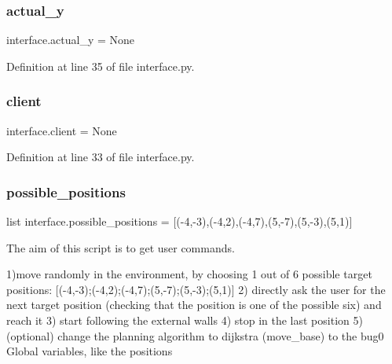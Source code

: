 \mbox{\label{namespaceinterface_af27b0b163a429bf0725f6c471e3f1998}} 
\subsubsection{\texorpdfstring{actual\+\_\+y}{actual\_y}}
{\footnotesize\ttfamily interface.\+actual\+\_\+y = None}



Definition at line 35 of file interface.\+py.

\mbox{\label{namespaceinterface_a2dc19bae4560767a9cff309d17ca0fc3}} 
\subsubsection{\texorpdfstring{client}{client}}
{\footnotesize\ttfamily interface.\+client = None}



Definition at line 33 of file interface.\+py.

\mbox{\label{namespaceinterface_a77dace02a869e1f2eab3089d30819e9e}} 
\subsubsection{\texorpdfstring{possible\+\_\+positions}{possible\_positions}}
{\footnotesize\ttfamily list interface.\+possible\+\_\+positions = \mbox{[}(-\/4,-\/3),(-\/4,2),(-\/4,7),(5,-\/7),(5,-\/3),(5,1)\mbox{]}}



The aim of this script is to get user commands. 

1)move randomly in the environment, by choosing 1 out of 6 possible target positions\+: \mbox{[}(-\/4,-\/3);(-\/4,2);(-\/4,7);(5,-\/7);(5,-\/3);(5,1)\mbox{]} 2) directly ask the user for the next target position (checking that the position is one of the possible six) and reach it 3) start following the external walls 4) stop in the last position 5) (optional) change the planning algorithm to dijkstra (move\+\_\+base) to the bug0 Global variables, like the positions 

